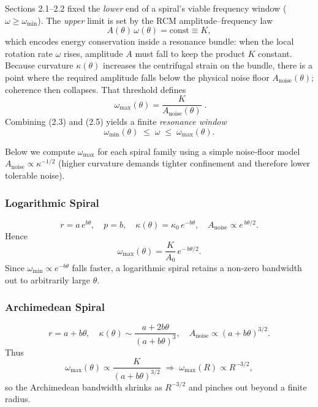 Sections 2.1–2.2 fixed the \emph{lower} end of a spiral’s viable frequency window (\(\omega \ge \omega_{\min}\)).  The \emph{upper} limit is set by the RCM amplitude–frequency law
\begin{equation}
  A(\theta)\,\omega(\theta) = \text{const} \equiv K,
  \tag{2.4}
\end{equation}
which encodes energy conservation inside a resonance bundle: when the local rotation rate \(\omega\) rises, amplitude \(A\) must fall to keep the product \(K\) constant.  Because curvature \(\kappa(\theta)\) increases the centrifugal strain on the bundle, there is a point where the required amplitude falls below the physical noise floor \(A_{\text{noise}}(\theta)\); coherence then collapses.  That threshold defines
\begin{equation}
  \boxed{\;\omega_{\max}(\theta)
    = \frac{K}{A_{\text{noise}}(\theta)}\;}.
  \tag{2.5}
\end{equation}
Combining (2.3) and (2.5) yields a finite \emph{resonance window}
\[
  \omega_{\min}(\theta)\;\le\;\omega\;\le\;\omega_{\max}(\theta).
\]

Below we compute \(\omega_{\max}\) for each spiral family using a simple noise‐floor model \(A_{\text{noise}}\propto\kappa^{-1/2}\) (higher curvature demands tighter confinement and therefore lower tolerable noise).

\subsubsection{Logarithmic Spiral}

\[
  r = a\,e^{b\theta}, \quad p=b,\quad
  \kappa(\theta)=\kappa_{0}\,e^{-b\theta},\quad
  A_{\text{noise}}\propto e^{\,b\theta/2}.
\]
Hence
\[
  \omega_{\max}(\theta)
  = \frac{K}{A_{0}}\,e^{-\,b\theta/2}.
\]
Since \(\omega_{\min}\propto e^{-b\theta}\) falls faster, a logarithmic spiral retains a non‐zero bandwidth out to arbitrarily large \(\theta\).

\subsubsection{Archimedean Spiral}

\[
  r = a + b\theta,\quad
  \kappa(\theta)\sim\frac{a+2b\theta}{(a+b\theta)^{3}},\quad
  A_{\text{noise}}\propto(a+b\theta)^{3/2}.
\]
Thus
\[
  \omega_{\max}(\theta)
  \propto\frac{K}{(a+b\theta)^{3/2}}
  \;\Longrightarrow\;
  \omega_{\max}(R)\propto R^{-3/2},
\]
so the Archimedean bandwidth shrinks as \(R^{-3/2}\) and pinches out beyond a finite radius.

